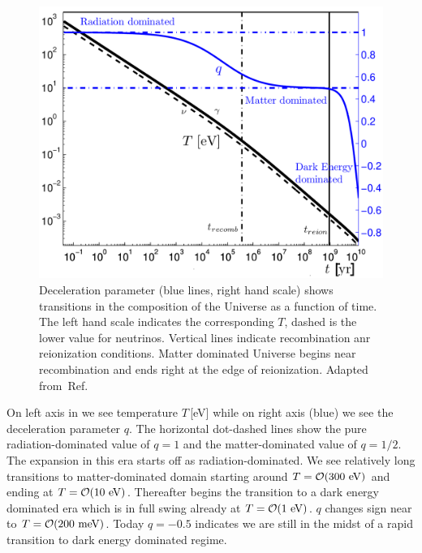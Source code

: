 {%
\begin{figure}
\centerline{\includegraphics[width=0.88\linewidth]{01-introduction/Figures/Tqtoday.png}}
\caption{Deceleration parameter (blue lines, right hand scale) shows  transitions in the composition of the Universe as a function of time. The left hand scale indicates the corresponding $T$, dashed is the lower value for neutrinos. Vertical lines indicate recombination anr reionization conditions. Matter dominated Universe begins near recombination and ends right at the edge of reionization.  Adapted from~Ref.\,\cite{Rafelski:2013yka}
\label{fig:today} }
\end{figure}

On left axis in   we see temperature $T$\,[eV] while on right axis (blue) we see the deceleration parameter $q$. The horizontal dot-dashed lines show the pure radiation-dominated value of $q=1$ and the matter-dominated value of $q=1/2$. The expansion in this era starts off as radiation-dominated. We see relatively long transitions to matter-dominated domain starting around $T=\mathcal{O}(300\text{ eV})$ and  ending at $T=\mathcal{O}(10\text{ eV})$. Thereafter begins the transition to a dark energy dominated era which is in full swing already at  $T=\mathcal{O}(1\text{ eV})$. $q$ changes sign near to  $T=\mathcal{O}(200\text{ meV})$. Today $q=-0.5$ indicates we are still in the midst of a rapid transition to dark energy dominated regime. 

}
